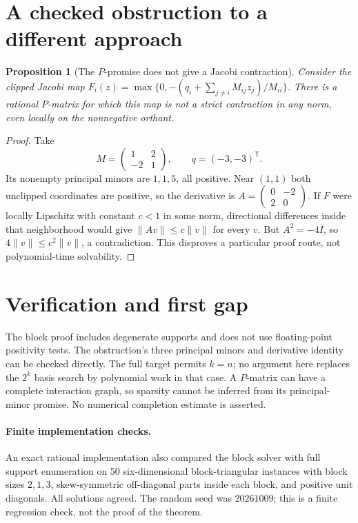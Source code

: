 \documentclass[11pt]{article}
\newtheorem{proposition}[theorem]{Proposition}
\theoremstyle{definition}
\begin{document}
\section{A checked obstruction to a different approach}
\begin{proposition}[The $P$-promise does not give a Jacobi contraction]
Consider the clipped Jacobi map
$F_i(z)=\max\{0,-(q_i+\sum_{j\ne i}M_{ij}z_j)/M_{ii}\}$.
There is a rational $P$-matrix for which this map is not a strict contraction
in any norm, even locally on the nonnegative orthant.
\end{proposition}
\begin{proof}
Take
\[
 M=\begin{pmatrix}1&2\\-2&1\end{pmatrix},\qquad q=(-3,-3)^{\mathsf T}.
\]
Its nonempty principal minors are $1,1,5$, all positive. Near $(1,1)$ both
unclipped coordinates are positive, so the derivative is
$A=\left(\begin{smallmatrix}0&-2\\2&0\end{smallmatrix}\right)$.
If $F$ were locally Lipschitz with constant $c<1$ in some norm, directional
differences inside that neighborhood would give $\|Av\|\leq c\|v\|$ for
every $v$. But $A^2=-4I$, so $4\|v\|\leq c^2\|v\|$, a contradiction.
This disproves a particular proof route, not polynomial-time solvability.
\end{proof}

\section{Verification and first gap}
The block proof includes degenerate supports and does not use floating-point
positivity tests. The obstruction's three principal minors and derivative
identity can be checked directly. The full target permits $k=n$; no argument
here replaces the $2^k$ basis search by polynomial work in that case. A
$P$-matrix can have a complete interaction graph, so sparsity cannot be inferred
from its principal-minor promise. No numerical completion estimate is asserted.

\paragraph{Finite implementation checks.}
An exact rational implementation also compared the block solver with full
support enumeration on 50 six-dimensional block-triangular instances with
block sizes $2,1,3$, skew-symmetric off-diagonal parts inside each block,
and positive unit diagonals. All solutions agreed. The random seed was
$20261009$; this is a finite regression check, not the proof of the theorem.
\end{document}
